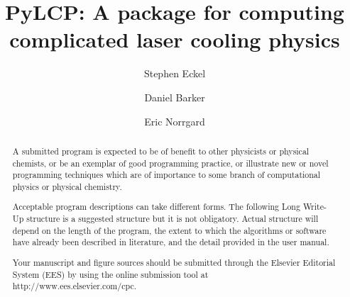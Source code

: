 \documentclass[final,5p,times,twocolumn]{elsarticle}
\begin{document}
\begin{frontmatter}



\title{PyLCP: A package for computing complicated laser cooling physics}


\author[a]{Stephen Eckel}
\author[a]{Daniel Barker}
\author[a]{Eric Norrgard}

\address[a]{National Institute of Standards and Technology, Sensor Sciences Division, 100 Bureau Dr., Gaithersburg, MD 20899}

\begin{abstract}
A submitted program is expected to be of benefit to other physicists or physical chemists, or be an exemplar of good programming practice, or illustrate new or novel programming techniques which are of importance to some branch of computational physics or physical chemistry.

Acceptable program descriptions can take different forms. The following Long Write-Up structure is a suggested structure but it is not obligatory. Actual structure will depend on the length of the program, the extent to which the algorithms or software have already been described in literature, and the detail provided in the user manual.

Your manuscript and figure sources should be submitted through the Elsevier Editorial System (EES) by using the online submission tool at \\
http://www.ees.elsevier.com/cpc.


\end{abstract}
\end{frontmatter}
\end{document}
